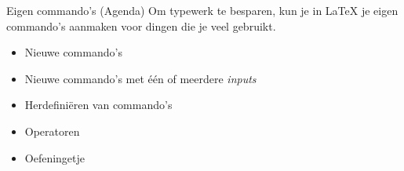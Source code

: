 \begin{frame}[fragile]{Eigen commando's (Agenda)}
Om typewerk te besparen, kun je in \LaTeX{} je eigen commando's aanmaken 
voor dingen die je veel gebruikt. 
\pause 
\begin{itemize}[label=\textbullet]
    \item Nieuwe commando's 
    \pause
    \item Nieuwe commando's met één of meerdere \emph{inputs} 
    \pause
    \item Herdefiniëren van commando's 
    \pause
    \item Operatoren 
    \pause
    \item Oefeningetje 
\end{itemize}
\end{frame}
